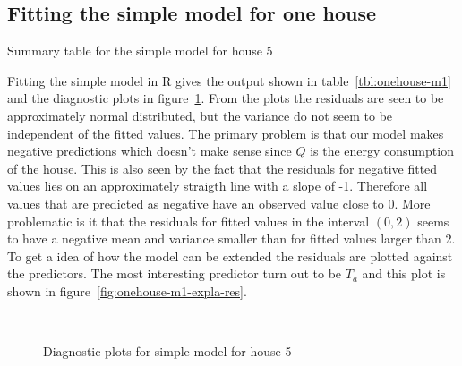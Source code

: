 \subsection*{Fitting the simple model for one house}
\begin{table}[ht]
    \centering
    
    \caption{Summary table for the simple model for house 5}\label{tbl:onehouse-m1}
\end{table}
Fitting the simple model  in R gives the output shown in table~\ref{tbl:onehouse-m1} and the diagnostic plots in figure~\ref{fig:onehouse-m1-diagnostics}. From the plots the residuals are seen to be approximately normal distributed, but the variance do not seem to be independent of the fitted values. The primary problem is that our model makes negative predictions which doesn't make sense since $Q$ is the energy consumption of the house. This is also seen by the fact that the residuals for negative fitted values lies on an approximately straigth line with a slope of -1. Therefore all values that are predicted as negative have an observed value close to 0. More problematic is it that the residuals for fitted values in the interval $(0,2)$ seems to have a negative mean and variance smaller than for fitted values larger than 2. To get a idea of how the model can be extended the residuals are plotted against the predictors. The most interesting predictor turn out to be $T_a$ and this plot is shown in figure~\ref{fig:onehouse-m1-expla-res}. 
\begin{figure}[ht]
    \centering
    \mbox{ \quad 
          }
    \caption{Diagnostic plots for simple model for house 5}
    \label{fig:onehouse-m1-diagnostics}
\end{figure}
